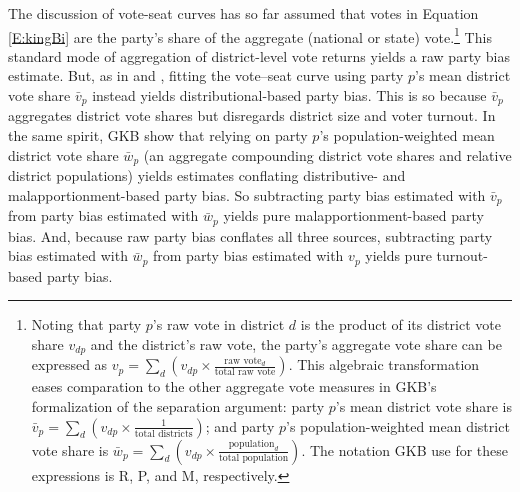 \documentclass[letter,12pt]{article}
\begin{document}
The discussion of vote-seat curves has so far assumed that votes in Equation \ref{E:kingBi} are the party's share of the aggregate (national or state) vote.\footnote{Noting that party $p$'s raw vote in district $d$ is the product of its district vote share $v_{dp}$ and the district's raw vote, the party's aggregate vote share can be expressed as $v_p = \sum_d (v_{dp} \times \frac{\text{raw vote}_d}{\text{total raw vote}})$. This algebraic transformation eases comparation to the other aggregate vote measures in GKB's formalization of the separation argument: party $p$'s mean district vote share is $\bar{v}_p = \sum_d (v_{dp} \times \frac{1}{\text{total districts}})$; and party $p$'s population-weighted mean district vote share is $\bar{w}_p = \sum_d (v_{dp} \times \frac{\text{population}_d}{\text{total population}})$. The notation GKB use for these expressions is R, P, and M, respectively.} This standard mode of aggregation of district-level vote returns yields a raw party bias estimate. But, as in \citet{tufte1973seatsVotes} and \citet{gelman.king.1994EvalElSysRedis}, fitting the vote--seat curve using party $p$'s mean district vote share $\bar{v}_p$ instead yields distributional-based party bias. This is so because $\bar{v}_p$ aggregates district vote shares but disregards district size and voter turnout. In the same spirit, GKB show that relying on party $p$'s population-weighted mean district vote share $\bar{w}_p$ (an aggregate compounding district vote shares and relative district populations) yields estimates conflating distributive- and malapportionment-based party bias. So subtracting party bias estimated with $\bar{v}_p$ from party bias estimated with $\bar{w}_p$ yields pure malapportionment-based party bias. And, because raw party bias conflates all three sources, subtracting party bias estimated with $\bar{w}_p$ from party bias estimated with $v_p$ yields pure turnout-based party bias. 
\end{document}
